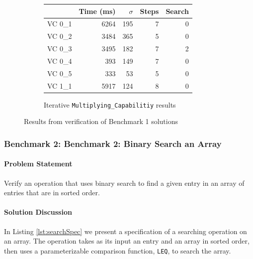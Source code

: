 \begin{figure}
	\vspace{2em}
	\begin{subfigure}[b]{0.6\textwidth}
		\centering
		\begin{tabular}{lrrrr}
			\toprule
				& Time (ms)	& $\sigma$& Steps & Search \\
			\midrule
			VC 0\_1	& 6264		& 195	& 7	& 0     \\
			VC 0\_2	& 3484		& 365	& 5	& 0     \\
			VC 0\_3	& 3495		& 182	& 7	& 2     \\
			VC 0\_4	& 393		& 149	& 7	& 0     \\
			VC 0\_5	& 333		& 53	& 5	& 0     \\
			VC 1\_1	& 5917		& 124	& 8	& 0     \\
			\bottomrule
		\end{tabular}
		\caption{Iterative \texttt{Multiplying\_Capabilitiy} results\label{fig:iterMultResults}}
	\end{subfigure}
  \caption{Results from verification of Benchmark 1 solutions\label{fig:addMultResults}}
\end{figure}


		\subsubsection{Benchmark 2: Benchmark 2: Binary Search an Array}	%

\paragraph{Problem Statement}Verify an operation that uses binary search to find a given entry in an array of entries that are in sorted order.

\paragraph{Solution Discussion}In Listing \ref{lst:searchSpec} we present a specification of a searching operation on an array.  The operation takes as its input an entry and an array in sorted order, then uses a parameterizable comparison function, \texttt{LEQ}, to search the array.



